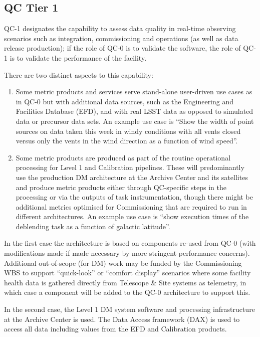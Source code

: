 \documentclass[DM,toc,lsstdraft]{lsstdoc}
\begin{document}
\subsection{QC Tier 1}

QC-1 designates the capability to assess data quality in real-time observing scenarios such as integration, commissioning and operations (as well as data release production); if the role of QC-0 is to validate the software, the role of QC-1 is to validate the performance of the facility.

There are two distinct aspects to this capability:

\begin{enumerate}
\item Some metric products and services serve stand-alone user-driven use cases as in QC-0 but with additional data sources, such as the Engineering and Facilities Database (EFD), and with real LSST data as opposed to simulated data or precursor data sets.  An example use case is ``Show the width of point sources on data taken this week in windy conditions with all vents closed versus only the vents in the wind direction as a function of wind speed''.

\item Some metric products are produced as part of the routine operational processing for Level 1 and Calibration pipelines. These will predominantly use the production DM architecture at the Archive Center and its satellites and produce metric products either through QC-specific steps in the processing or via the outputs of task instrumentation, though there might be additional metrics optimised for Commissioning that are required to run in different architectures. An example use case is ``show execution times of the deblending task as a function of galactic latitude''.

\end{enumerate}

In the first case the architecture is based on components re-used from QC-0 (with modifications made if made necessary by more stringent performance concerns). Additional out-of-scope (for DM) work may be funded by the Commissioning WBS to support ``quick-look'' or ``comfort display'' scenarios where some facility health data is gathered directly from Telescope \& Site systems as telemetry, in which case a component will be added to the QC-0 architecture to support this.

In the second case, the Level 1 DM system software and processing infrastructure at the Archive Center is used. The Data Access framework (DAX) is used to access all data including values from the EFD and Calibration products.
\end{document}
